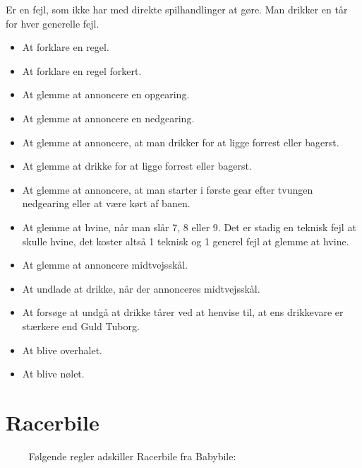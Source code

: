\documentclass[12pt]{article}
\begin{document}
Er en fejl, som ikke har med direkte spilhandlinger at gøre. Man drikker en tår for hver generelle fejl.

\begin{itemize}
	\item At forklare en regel.
	\item At forklare en regel forkert.
	\item At glemme at annoncere en opgearing.
	\item At glemme at annoncere en nedgearing.
	\item At glemme at annoncere, at man drikker for at ligge forrest eller bagerst.
	\item At glemme at drikke for at ligge forrest eller bagerst.
	\item At glemme at annoncere, at man starter i første gear efter tvungen nedgearing eller at være kørt af banen.
	\item At glemme at hvine, når man slår 7, 8 eller 9. Det er stadig en teknisk fejl at skulle hvine, det koster altså 1 teknisk og 1 generel fejl at glemme at hvine.
	\item At glemme at annoncere midtvejsskål.
	\item At undlade at drikke, når der annonceres midtvejsskål.
	\item At forsøge at undgå at drikke tårer ved at henvise til, at ens drikkevare er stærkere end Guld Tuborg.
	\item At blive overhalet.
	\item At blive nølet.
\end{itemize}


\newpage


\section*{Racerbile}

$\qquad$ Følgende regler adskiller Racerbile fra Babybile:
\end{document}
